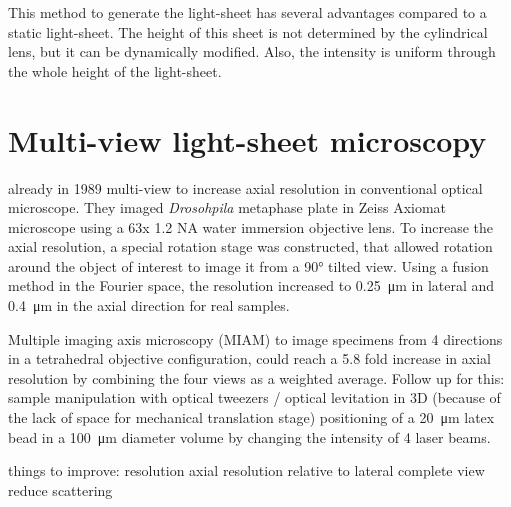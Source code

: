       This method to generate the light-sheet has several advantages compared to a static light-sheet. The height of this sheet is not determined by the cylindrical lens, but it can be dynamically modified. Also, the intensity is uniform through the whole height of the light-sheet.




\section{Multi-view light-sheet microscopy}
  already in 1989 multi-view to increase axial resolution in conventional optical microscope. They imaged \textit{Drosohpila} metaphase plate in Zeiss Axiomat microscope using a 63x 1.2 NA water immersion objective lens. To increase the axial resolution, a special rotation stage was constructed, that allowed rotation around the object of interest to image it from a 90\si{\degree} tilted view. Using a fusion method in the Fourier space, the resolution increased to \SI{0.25}{\micro\meter} in lateral and \SI{0.4}{\micro\meter} in the axial direction for real samples.

  Multiple imaging axis microscopy (MIAM) \cite{swoger_multiple_2003}
  to image specimens from 4 directions in a tetrahedral objective configuration, could reach a 5.8 fold increase in axial resolution by combining the four views as a weighted average.
  Follow up for this: sample manipulation with optical tweezers / optical levitation in 3D \cite{huisken_three-dimensional_2007}(because of the lack of space for mechanical translation stage)
  positioning of a \SI{20}{\micro m} latex bead in a \SI{100}{\micro m} diameter volume by changing the intensity of 4 laser beams. 

  things to improve: resolution
  axial resolution relative to lateral
  complete view
  reduce scattering

